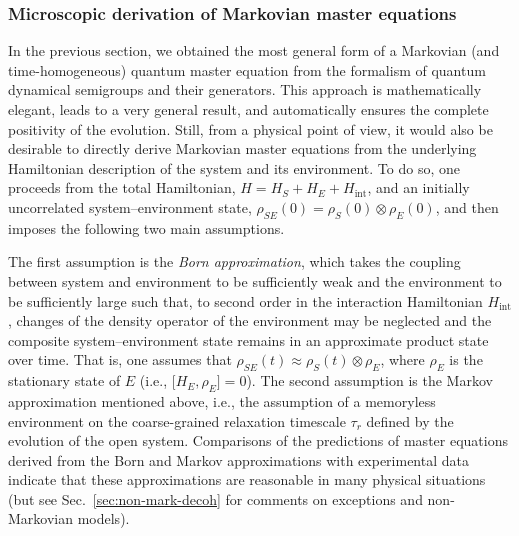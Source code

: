\documentclass[3p,sort&compress,12pt]{elsarticle}
\newcommand{\op}[1]{#1}
\begin{document}
\subsubsection{\label{sec:micr-deriv-mark}Microscopic derivation of Markovian master equations}

In the previous section, we obtained the most general form of a Markovian (and time-homogeneous) quantum master equation from the formalism of quantum dynamical semigroups and their generators. This approach is mathematically elegant, leads to a very general result, and automatically ensures the complete positivity of the evolution. Still, from a physical point of view, it would also be desirable to directly derive Markovian master equations from the underlying Hamiltonian description of the system and its environment. To do so, one proceeds from the total Hamiltonian, $\op{H}=\op{H}_S+\op{H}_E+\op{H}_\text{int}$, and an initially uncorrelated system--environment state, $\op{\rho}_{SE}(0)=\op{\rho}_{S}(0)\otimes \op{\rho}_{E}(0)$, and then imposes the following two main assumptions. 

The first assumption is the \emph{Born approximation}, which takes the coupling between system and environment to be sufficiently weak and the environment to be sufficiently large such that, to second order in the interaction Hamiltonian $\op{H}_\text{int}$, changes of the density operator of the environment may be neglected and the composite system--environment state remains in an approximate product state over time. That is, one assumes that $\op{\rho}_{SE}(t) \approx \op{\rho}_S(t) \otimes \op{\rho}_E$, where $\op{\rho}_E$ is the stationary state of $E$ (i.e., $\bigl[ \op{H}_E, \op{\rho}_E \bigr] = 0$). The second assumption is the Markov approximation mentioned above, i.e., the assumption of a memoryless environment on the coarse-grained relaxation timescale $\tau_r$ defined by the evolution of the open system. Comparisons of the predictions of master equations derived from the Born and Markov approximations with experimental data indicate that these approximations are reasonable in many physical situations (but see Sec.~\ref{sec:non-mark-decoh} for comments on exceptions and non-Markovian models). 
\end{document}
